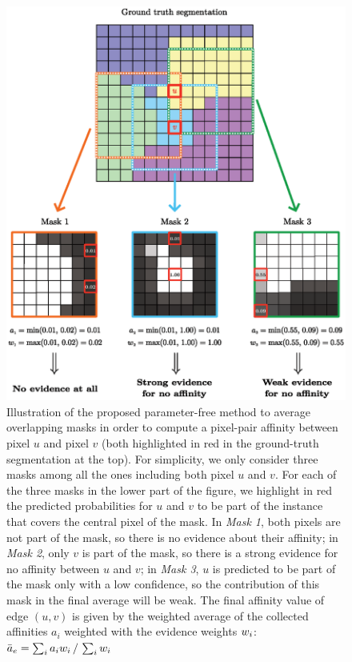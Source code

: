 \begin{figure}[t]
\centering
        \includegraphics[width=\textwidth]{./figs/mask_average.eps} %
        \caption{Illustration of the proposed parameter-free method to average overlapping masks in order to compute a pixel-pair affinity between pixel $u$ and pixel $v$ (both highlighted in red in the ground-truth segmentation at the top). For simplicity, we only consider three masks among all the ones including both pixel $u$ and $v$. For each of the three masks in the lower part of the figure, we highlight in red the predicted probabilities for $u$ and $v$ to be part of the instance that covers the central pixel of the mask. In \emph{Mask 1}, both pixels are not part of the \maskname mask, so there is no evidence about their affinity; in \emph{Mask 2}, only $v$ is part of the mask, so there is a strong evidence for no affinity between $u$ and $v$; in \emph{Mask 3}, $u$ is predicted to be part of the mask only with a low confidence, so the contribution of this mask in the final average will be weak. The final affinity value of edge $(u,v)$ is given by the weighted average of the collected affinities $a_i$ weighted with the evidence weights $w_i$: $\bar{a}_e= \sum_{i} a_i w_i\,/\,\sum_{i}w_i$}
    \label{fig:alg_explained}
\end{figure}

